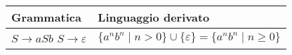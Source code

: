 \documentclass{standalone}
\begin{document}
\begin{tabularx}{\textwidth}{XX}
		Grammatica & Linguaggio derivato \\
    \midrule
        $S \to aSb$ \newline
        $S \to \varepsilon$
        & 
        $\{a^nb^n \mid n>0\} \cup \{\varepsilon\} = \{a^nb^n \mid n \ge 0\}$
\end{tabularx}
\end{document}
